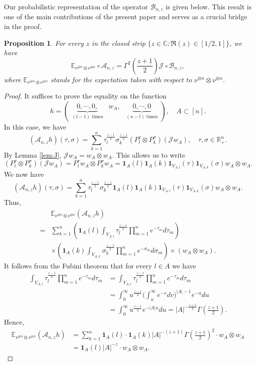 \documentclass{amsart}
\numberwithin{equation}{section}
\newtheorem{prop}[thm]{Proposition}
\theoremstyle{definition}
\theoremstyle{remark}
\newcommand{\1}{\mathbf 1}
\begin{document}
Our probabilistic representation of the operator $\mathcal{B}_{n,z}$ is given below. This result is one of the main contributions of the present paper and serves as a crucial bridge in the proof.
\begin{prop}\label{thm:averaging}
For every $z$ in the closed strip $\{z\in \mathbb{C}:\Re(z)\in [1/2,1]\}$, we have
\begin{equation*}
\mathbb{E}_{\nu^{\otimes n}\otimes \nu^{\otimes n}}\circ\mathcal{A}_{n,z}=\Gamma^2\left(\frac{z+1}{2}\right)\mathcal{J}\circ\mathcal{B}_{n,z},
\end{equation*}
where $\mathbb{E}_{\nu^{\otimes n}\otimes \nu^{\otimes n}}$ stands for the expectation taken with respect to $\nu^{\otimes n}\otimes \nu^{\otimes n}$.
\end{prop}
\begin{proof}
It suffices to prove the equality on the function
$$h=
\begin{pmatrix}
\underbrace{0,\cdots,0,}_{(l-1)\mbox{ times}} & w_A, & \underbrace{0,\cdots,0}_{(n-l)\mbox{ times}}
\end{pmatrix},\quad A\subset [n].$$
In this case, we have
$$(\mathcal{A}_{n,z}h)(\tau,\sigma)=\sum_{k=1}^n\tau_l^{\frac{z-1}{2}}\sigma_k^{\frac{z-1}{2}}
 (P_l^{\tau}\otimes P_k^{\sigma})(\mathcal{J}w_A),\quad \tau,\sigma\in\mathbb{R}^n_+.$$
By Lemma \ref{lem:J}, $\mathcal{J}w_A=w_A\otimes w_A.$ This allows us to write
$$(P_l^{\tau}\otimes P_k^{\sigma})(\mathcal{J} w_A)=P_l^{\tau}w_A\otimes P_k^{\sigma}w_A=\1_A(l)\1_A(k)\1_{V_{A,l}}(\tau)\1_{V_{A,k}}(\sigma)w_A\otimes w_A.$$
We now have
$$(\mathcal{A}_{n,z}h)(\tau,\sigma)
 =\sum_{k=1}^n
 \tau_l^{\frac{z-1}{2}}\sigma_k^{\frac{z-1}{2}}\1_A(l)\1_A(k)\1_{V_{A,l}}(\tau)\1_{V_{A,k}}(\sigma)
 w_A\otimes w_A.$$
Thus,
\begin{align*}
&\mathbb{E}_{\nu^{\otimes n}\otimes \nu^{\otimes n}}(\mathcal{A}_{n,z}h)\\
=&\sum_{k=1}^n\left(\1_A(l)\int_{V_{A,l}}\tau_l^{\frac{z-1}{2}}\prod_{m=1}^ne^{-\tau_m}d\tau_m\right)\\
&\times\left(\1_A(k)\int_{V_{A,k}}\sigma_k^{\frac{z-1}{2}}\prod_{m=1}^ne^{-\sigma_m}d\sigma_m\right)\times (w_A\otimes w_A).
\end{align*}
It follows from the Fubini theorem that for every $l\in A$ we have
\begin{align*}
\int_{V_{A,l}}\tau_l^{\frac{z-1}{2}}\prod_{m=1}^ne^{-\tau_m}d\tau_m&=\int_{V_{A,l}}\tau_l^{\frac{z-1}{2}}\prod_{m=1}^ne^{-\tau_m}d\tau_m\\
&=\int_0^{\infty}u^{\frac{z-1}{2}}\Big(\int_u^{\infty}e^{-v}dv\Big)^{|A|-1}e^{-u}du\\
&=\int_0^{\infty}u^{\frac{z-1}{2}}e^{-|A|u}du=|A|^{-\frac{z+1}{2}}\Gamma\left(\frac{z+1}{2}\right).
\end{align*}
Hence,
\begin{align*}
\mathbb{E}_{\nu^{\otimes n}\otimes \nu^{\otimes n}}(\mathcal{A}_{n,z}h)&=\sum_{k=1}^n\1_A(l)\cdot \1_A(k)|A|^{-(z+1)}\Gamma\left(\frac{z+1}{2}\right)^{2}\cdot w_A\otimes w_A\\
&=\1_A(l)|A|^{-z}\cdot w_A\otimes w_A.
\end{align*}


\end{proof}
\end{document}
